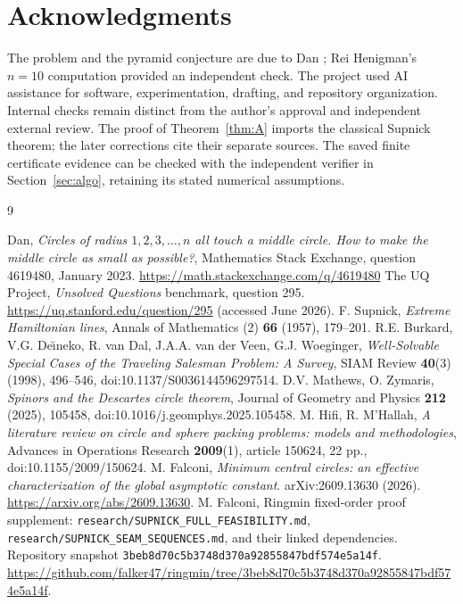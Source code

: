 \documentclass[11pt]{article}
\theoremstyle{definition}
\theoremstyle{remark}
\begin{document}
\section*{Acknowledgments}
The problem and the pyramid conjecture are due to Dan \cite{mse}; Rei Henigman's $n=10$ computation provided an independent check. The project used AI assistance for software, experimentation, drafting, and repository organization. Internal checks remain distinct from the author's approval and independent external review. The proof of Theorem~\ref{thm:A} imports the classical Supnick theorem; the later corrections cite their separate sources. The saved finite certificate evidence can be checked with the independent verifier in Section~\ref{sec:algo}, retaining its stated numerical assumptions.

\begin{thebibliography}{9}
\small\raggedright
{} Dan, \emph{Circles of radius $1,2,3,\dots,n$ all touch a middle circle. How to make the middle circle as small as possible?}, Mathematics Stack Exchange, question 4619480, January 2023. \url{https://math.stackexchange.com/q/4619480}
 The UQ Project, \emph{Unsolved Questions} benchmark, question 295. \url{https://uq.stanford.edu/question/295} (accessed June 2026).
 F. Supnick, \emph{Extreme Hamiltonian lines}, Annals of Mathematics (2) \textbf{66} (1957), 179--201.
 R.E. Burkard, V.G. De\u{\i}neko, R. van Dal, J.A.A. van der Veen, G.J. Woeginger, \emph{Well-Solvable Special Cases of the Traveling Salesman Problem: A Survey}, SIAM Review \textbf{40}(3) (1998), 496--546, doi:10.1137/S0036144596297514.
 D.V. Mathews, O. Zymaris, \emph{Spinors and the Descartes circle theorem}, Journal of Geometry and Physics \textbf{212} (2025), 105458, doi:10.1016/j.geomphys.2025.105458.
 M. Hifi, R. M'Hallah, \emph{A literature review on circle and sphere packing problems: models and methodologies}, Advances in Operations Research \textbf{2009}(1), article 150624, 22 pp., doi:10.1155/2009/150624.
 M. Falconi, \emph{Minimum central circles: an effective characterization of the global asymptotic constant}. arXiv:2609.13630 (2026). \url{https://arxiv.org/abs/2609.13630}.
 M. Falconi, Ringmin fixed-order proof supplement: \nolinkurl{research/SUPNICK_FULL_FEASIBILITY.md}, \nolinkurl{research/SUPNICK_SEAM_SEQUENCES.md}, and their linked dependencies. Repository snapshot \texttt{3beb8d70c5b3748d370a92855847bdf574e5a14f}. \url{https://github.com/falker47/ringmin/tree/3beb8d70c5b3748d370a92855847bdf574e5a14f}.
\end{thebibliography}
\end{document}
